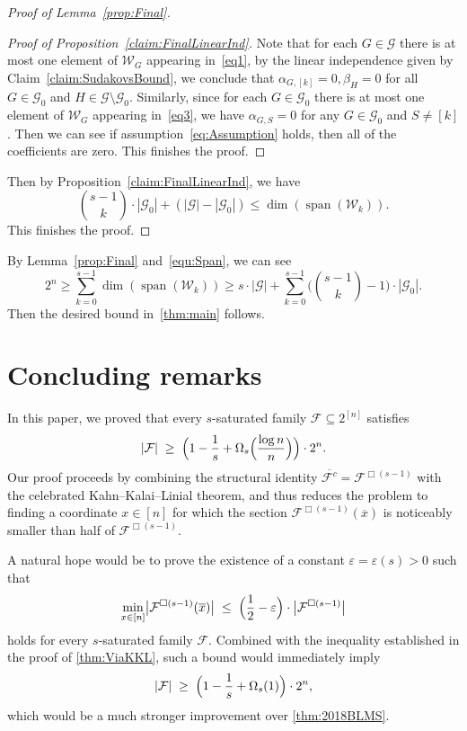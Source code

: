 \documentclass[11pt]{article}
\theoremstyle{definition}
\begin{document}
\begin{proof}[Proof of Lemma~\ref{prop:Final}]
\begin{proof}[Proof of Proposition~\ref{claim:FinalLinearInd}]
      Note that for each $G\in \mathcal{G}$ there is at most one element of $\mathcal{W}_G$ appearing in~\eqref{eq1}, by the linear independence given by Claim~\ref{claim:SudakovsBound}, we conclude that $\alpha_{G,[k]}=0,\beta_{H}=0$ for all $G\in \mathcal{G}_0$ and $H\in \mathcal{G}\setminus\mathcal{G}_{0}$.
     Similarly, since for each $G\in \mathcal{G}_{0}$ there is at most one element of $\mathcal{W}_G$ appearing in~\eqref{eq3}, we have $\alpha_{G,S}=0$ for any $G\in \mathcal{G}_{0}$ and $S\neq [k]$. Then we can see if assumption~\eqref{eq:Assumption} holds, then all of the coefficients are zero. This finishes the proof.



    
\end{proof}
Then by Proposition~\ref{claim:FinalLinearInd}, we have
\[
\binom{s-1}{k}\cdot|\mathcal{G}_{0}|+(|\mathcal{G}|-|\mathcal{G}_{0}|)\le \dim(\operatorname{span}(\mathcal{W}_{k})).
\]
This finishes the proof.
\end{proof}

By Lemma~\ref{prop:Final} and~\eqref{equ:Span}, we can see 
\[
2^{n}\ge \sum\limits_{k=0}^{s-1}\dim(\operatorname{span}(\mathcal{W}_{k}))\ge s\cdot |\mathcal{G}| + \sum\limits_{k=0}^{s-1}\bigg(\binom{s-1}{k}-1\bigg)\cdot |\mathcal{G}_{0}|. 
\]
Then the desired bound in~\cref{thm:main} follows.

\section{Concluding remarks}
In this paper, we proved that every \(s\)-saturated family \(\mathcal{F}\subseteq 2^{[n]}\) satisfies
\[
|\mathcal{F}|
\;\ge\;
\Bigl(1-\frac{1}{s}+\Omega_{s}\Bigl(\frac{\log n}{n}\Bigr)\Bigr)\cdot 2^{n}.
\]
Our proof proceeds by combining the structural identity
\(
\overline{\mathcal{F}^{c}}=\mathcal{F}^{\Box (s-1)}
\)
with the celebrated Kahn--Kalai--Linial theorem, and thus reduces the problem to finding a coordinate
\(x\in [n]\) for which the section
\(
\mathcal{F}^{\Box(s-1)}(\overline{x})
\)
is noticeably smaller than half of \(\mathcal{F}^{\Box(s-1)}\).

A natural hope would be to prove the existence of a constant \(\varepsilon=\varepsilon(s)>0\) such that
\[
\min_{x\in [n]}
\bigl|\mathcal{F}^{\Box(s-1)}(\overline{x})\bigr|
\;\le\;
\Bigl(\frac12-\varepsilon\Bigr)\cdot
\bigl|\mathcal{F}^{\Box(s-1)}\bigr|
\]
holds for every \(s\)-saturated family \(\mathcal{F}\). Combined with the inequality established in the proof of \cref{thm:ViaKKL}, such a bound would immediately imply
\[
|\mathcal{F}|
\;\ge\;
\Bigl(1-\frac{1}{s}+\Omega_s(1)\Bigr)\cdot 2^{n},
\]
which would be a much stronger improvement over \cref{thm:2018BLMS}.
\end{document}
